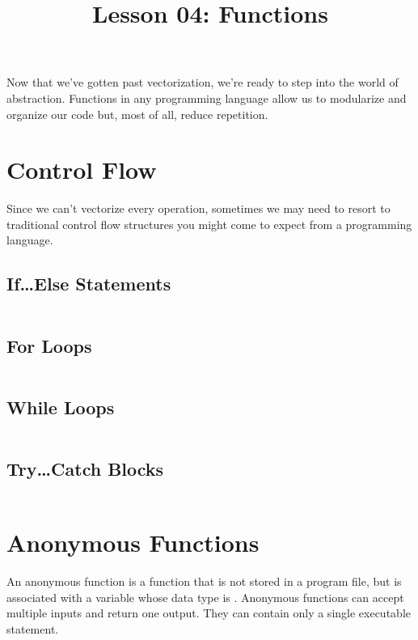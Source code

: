 \documentclass{article}
\title{Lesson 04: Functions}
\begin{document}
\renderTitle

Now that we've gotten past vectorization, we're ready to step into the
world of abstraction.  Functions in any programming language allow us to
modularize and organize our code but, most of all, reduce repetition.

\section{Control Flow}

Since we can't vectorize every operation, sometimes we may need to
resort to traditional control flow structures you might come to expect
from a programming language.

\subsection{If\dots Else Statements}

\inputminted{matlab}{04-functions.d/if-else.m}

\subsection{For Loops}

\inputminted{matlab}{04-functions.d/for.m}

\subsection{While Loops}

\inputminted{matlab}{04-functions.d/while.m}

\subsection{Try\dots Catch Blocks}

\inputminted{matlab}{04-functions.d/try-catch.m}

\section{Anonymous Functions}

An anonymous function is a function that is not stored in a program
file, but is associated with a variable whose data type is .  Anonymous functions can accept multiple inputs and
return one output. They can contain only a single executable statement.%
\end{document}
